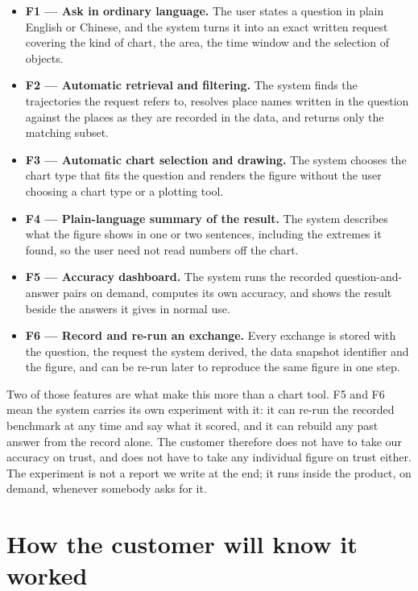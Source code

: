 \documentclass[12pt,a4paper]{report}
\begin{document}
\begin{itemize}
  \item \textbf{F1 --- Ask in ordinary language.} The user states a question in
    plain English or Chinese, and the system turns it into an exact written
    request covering the kind of chart, the area, the time window and the
    selection of objects.
  \item \textbf{F2 --- Automatic retrieval and filtering.} The system finds the
    trajectories the request refers to, resolves place names written in the
    question against the places as they are recorded in the data, and returns
    only the matching subset.
  \item \textbf{F3 --- Automatic chart selection and drawing.} The system
    chooses the chart type that fits the question and renders the figure without
    the user choosing a chart type or a plotting tool.
  \item \textbf{F4 --- Plain-language summary of the result.} The system
    describes what the figure shows in one or two sentences, including the
    extremes it found, so the user need not read numbers off the chart.
  \item \textbf{F5 --- Accuracy dashboard.} The system runs the recorded
    question-and-answer pairs on demand, computes its own accuracy, and shows
    the result beside the answers it gives in normal use.
  \item \textbf{F6 --- Record and re-run an exchange.} Every exchange is stored
    with the question, the request the system derived, the data snapshot
    identifier and the figure, and can be re-run later to reproduce the same
    figure in one step.
\end{itemize}

Two of those features are what make this more than a chart tool. F5 and F6 mean
the system carries its own experiment with it: it can re-run the recorded
benchmark at any time and say what it scored, and it can rebuild any past answer
from the record alone. The customer therefore does not have to take our accuracy
on trust, and does not have to take any individual figure on trust either. The
experiment is not a report we write at the end; it runs inside the product, on
demand, whenever somebody asks for it.

\section{How the customer will know it worked}
\end{document}
